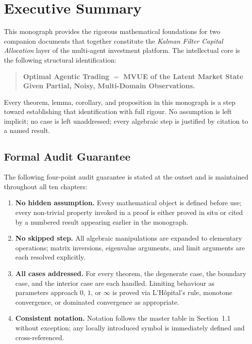 \documentclass[12pt,openany]{book}
\numberwithin{equation}{chapter}
\theoremstyle{plain}
\theoremstyle{definition}
\theoremstyle{remark}
\begin{document}
\chapter*{Executive Summary}

\noindent
This monograph provides the rigorous mathematical foundations for
two companion documents that together constitute the
\emph{Kalman Filter Capital Allocation} layer of the multi-agent
investment platform.  The intellectual core is the following
structural identification:

\begin{quote}
\textbf{Optimal Agentic Trading
$=$
MVUE of the Latent Market State\\
Given Partial, Noisy, Multi-Domain Observations.}
\end{quote}

\noindent
Every theorem, lemma, corollary, and proposition in this monograph
is a step toward establishing that identification with full rigour.
No assumption is left implicit; no case is left unaddressed; every
algebraic step is justified by citation to a named result.

\section*{Formal Audit Guarantee}

\noindent
The following four-point audit guarantee is stated at the outset and
is maintained throughout all ten chapters:

\begin{enumerate}[label=\textbf{AG\arabic*.}, leftmargin=3.8em,
                  itemsep=4pt, parsep=0pt, topsep=4pt]
  \item \textbf{No hidden assumption.}
        Every mathematical object is defined before use; every
        non-trivial property invoked in a proof is either proved in
        situ or cited by a numbered result appearing earlier in the
        monograph.
  \item \textbf{No skipped step.}
        All algebraic manipulations are expanded to elementary
        operations; matrix inversions, eigenvalue arguments, and
        limit arguments are each resolved explicitly.
  \item \textbf{All cases addressed.}
        For every theorem, the degenerate case, the boundary case,
        and the interior case are each handled.  Limiting behaviour
        as parameters approach $0$, $1$, or $\infty$ is proved via
        L'H\^{o}pital's rule, monotone convergence, or dominated
        convergence as appropriate.
  \item \textbf{Consistent notation.}
        Notation follows the master table in Section~1.1 without
        exception; any locally introduced symbol is immediately
        defined and cross-referenced.
\end{enumerate}
\end{document}
